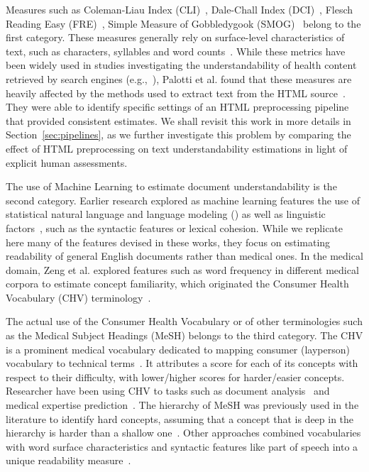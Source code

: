 Measures such as Coleman-Liau Index (CLI)~\cite{cli75}, Dale-Chall Index (DCI)~\cite{dale48}, Flesch Reading Easy (FRE)~\cite{flesch75}, Simple Measure of Gobbledygook (SMOG)~\cite{smog69} belong to the first category. These measures generally rely on surface-level characteristics of text, such as characters, syllables and word counts~\cite{dubay04}.
While these metrics have been widely used in studies investigating the understandability of health content retrieved by search engines (e.g.,~\cite{becker04,graber99readability,fitzsimmons10,stossel12,wiener13,patel13,atcherson14,meillier17}), Palotti et al. found that these measures are heavily affected by the methods used to extract text from the HTML source~\cite{palotti15}. They were able to identify specific settings of an HTML preprocessing pipeline that provided consistent  estimates. We shall revisit this work in more details in Section~\ref{sec:pipelines}, as we further investigate this problem by comparing the effect of HTML preprocessing on text understandability estimations in light of explicit human assessments. 

The use of Machine Learning to estimate document understandability is the second category. Earlier research explored as machine learning features the use of statistical natural language and language modeling (\cite{liu04,collins05,heilman07}) as well as linguistic factors~\cite{pitler08}, such as the syntactic features or lexical cohesion. While we replicate here many of the features devised in these works, they focus on estimating readability of general English documents rather than medical ones. In the medical domain, Zeng et al. explored features such as word frequency in different medical corpora to estimate concept familiarity, which originated the Consumer Health Vocabulary (CHV) terminology~\cite{zeng05,zeng06,zeng08}.  

The actual use of the Consumer Health Vocabulary or of other terminologies such as the Medical Subject Headings (MeSH) belongs to the third category. The CHV is a prominent medical vocabulary dedicated to mapping consumer (layperson) vocabulary to technical terms~\cite{zeng06}. It attributes a score for each of its concepts with respect to their difficulty, with lower/higher scores for harder/easier concepts. Researcher have been using CHV to tasks such as document analysis~\cite{leroy08} and medical expertise prediction~\cite{palotti14}.
The hierarchy of MeSH was previously used in the literature to identify hard concepts, assuming that a concept that is deep in the hierarchy is harder than a shallow one~\cite{yan11}. Other approaches combined vocabularies with word surface characteristics and syntactic features like part of speech into a unique readability measure~\cite{kim2007beyond}.

